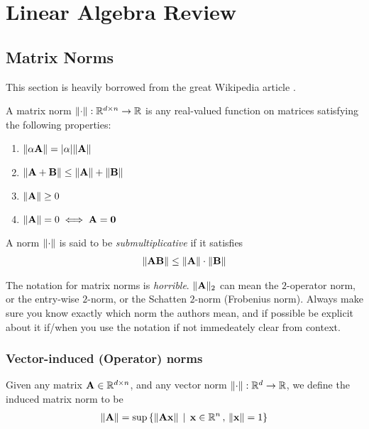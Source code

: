 \section{Linear Algebra Review}
\subsection{Matrix Norms}
This section is heavily borrowed from the great Wikipedia article \cite{wiki:Matrix_norm}.
\begin{defn}
A matrix norm $\lVert \cdot \rVert: \mathbb{R}^{d \times n} \to \mathbb{R}$ is any real-valued function on matrices satisfying the following properties:
\begin{enumerate}
    \item $\lVert \alpha \mathbf{A} \rVert = |\alpha| \lVert \mathbf{A} \rVert$
    \item $\lVert \mathbf{A} + {\bf B} \rVert \leq \lVert \mathbf{A} \rVert + \lVert \bf B \rVert$
    \item $\lVert \mathbf{A} \rVert \geq 0$
    \item $\lVert \mathbf{A} \rVert = 0 \iff \mathbf{A} = {\bf 0}$
\end{enumerate}
\end{defn}
\begin{prop}
    A norm $\lVert \cdot \rVert$ is said to be {\em submultiplicative} if it satisfies
    \begin{align*}
        \lVert \mathbf{A} {\bf B} \rVert \leq \lVert \mathbf{A} \rVert \cdot \lVert \bf B \rVert
    \end{align*}
\end{prop}

\begin{remark}
    The notation for matrix norms is {\em horrible}. $\lVert \mathbf{A} \rVert_2$ can mean the $2$-operator norm, or the entry-wise $2$-norm, or the Schatten $2$-norm (Frobenius norm).
    Always make sure you know exactly which norm the authors mean, and if possible be explicit about it if/when you use the notation if not immedeately
    clear from context.
\end{remark}
\subsubsection{Vector-induced (Operator) norms}
\label{sec:linalg:opnorm}
Given any matrix $\mathbf{A} \in \mathbb{R}^{d \times n}$, and any vector norm $\lVert \cdot \rVert: \mathbb{R}^d \to \mathbb{R}$, we define
the induced matrix norm to be
\begin{align*}
    \lVert \mathbf{A} \rVert = \sup \, \{ \lVert \mathbf{A} \mathbf{x} \rVert \, \mid \, \mathbf{x} \in \mathbb{R}^n \, , \, \lVert \mathbf{x} \rVert = 1 \}
\end{align*}
